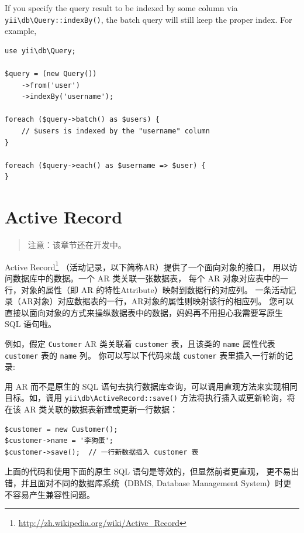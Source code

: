 If you specify the query result to be indexed by some column via \texttt{yii{\allowbreak{}\textbackslash}db{\allowbreak{}\textbackslash}Query\allowbreak{}::\allowbreak{}indexBy()}, the batch query
will still keep the proper index. For example,

\lstset{language=php}\begin{lstlisting}
use yii\db\Query;

$query = (new Query())
    ->from('user')
    ->indexBy('username');

foreach ($query->batch() as $users) {
    // $users is indexed by the "username" column
}

foreach ($query->each() as $username => $user) {
}
\end{lstlisting}


\label{db-active-record.md}\section{Active Record}
\begin{quote}注意：该章节还在开发中。

\end{quote}
Active Record\footnote{\url{http://zh.wikipedia.org/wiki/Active\_Record}} （活动记录，以下简称AR）提供了一个面向对象的接口，
用以访问数据库中的数据。一个 AR 类关联一张数据表，
每个 AR 对象对应表中的一行，对象的属性（即 AR 的特性Attribute）映射到数据行的对应列。
一条活动记录（AR对象）对应数据表的一行，AR对象的属性则映射该行的相应列。
您可以直接以面向对象的方式来操纵数据表中的数据，妈妈再不用担心我需要写原生 SQL 语句啦。

例如，假定 \lstinline|Customer| AR 类关联着 \lstinline|customer| 表，且该类的 \lstinline|name| 属性代表 \lstinline|customer| 表的 \lstinline|name| 列。
你可以写以下代码来哉 \lstinline|customer| 表里插入一行新的记录:

用 AR 而不是原生的 SQL 语句去执行数据库查询，可以调用直观方法来实现相同目标。如，调用 \texttt{yii{\allowbreak{}\textbackslash}db{\allowbreak{}\textbackslash}ActiveRecord\allowbreak{}::\allowbreak{}save()} 方法将执行插入或更新轮询，将在该 AR 类关联的数据表新建或更新一行数据：

\lstset{language=php}\begin{lstlisting}
$customer = new Customer();
$customer->name = '李狗蛋';
$customer->save();  // 一行新数据插入 customer 表
\end{lstlisting}
上面的代码和使用下面的原生 SQL 语句是等效的，但显然前者更直观，
更不易出错，并且面对不同的数据库系统（DBMS, Database Management System）时更不容易产生兼容性问题。

